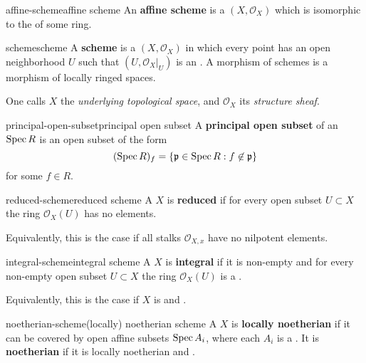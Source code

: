 \begin{topic}{affine-scheme}{affine scheme}
    An \textbf{affine scheme} is a  $(X, \mathcal{O}_X)$ which is isomorphic to the  of some ring.
\end{topic}

\begin{topic}{scheme}{scheme}
    A \textbf{scheme} is a  $(X, \mathcal{O}_X)$ in which every point has an open neighborhood $U$ such that $(U, \mathcal{O}_X|_U)$ is an . A morphism of schemes is a morphism of locally ringed spaces.
    
    One calls $X$ the \textit{underlying topological space}, and $\mathcal{O}_X$ its \textit{structure sheaf}.
\end{topic}

\begin{topic}{principal-open-subset}{principal open subset}
    A \textbf{principal open subset} of an  $\operatorname{Spec} R$ is an open subset of the form
    \[ (\operatorname{Spec} R)_f = \{ \mathfrak{p} \in \operatorname{Spec} R : f \not\in \mathfrak{p} \} \]
    for some $f \in R$.
\end{topic}

\begin{topic}{reduced-scheme}{reduced scheme}
    A  $X$ is \textbf{reduced} if for every open subset $U \subset X$ the ring $\mathcal{O}_X(U)$ has no  elements.
    
    Equivalently, this is the case if all stalks $\mathcal{O}_{X, x}$ have no nilpotent elements.
\end{topic}

\begin{topic}{integral-scheme}{integral scheme}
    A  $X$ is \textbf{integral} if it is non-empty and for every non-empty open subset $U \subset X$ the ring $\mathcal{O}_X(U)$ is a .
    
    Equivalently, this is the case if $X$ is  and .
\end{topic}

\begin{topic}{noetherian-scheme}{(locally) noetherian scheme}
    A  $X$ is \textbf{locally noetherian} if it can be covered by open affine subsets $\operatorname{Spec} A_i$, where each $A_i$ is a . It is \textbf{noetherian} if it is locally noetherian and .
\end{topic}

